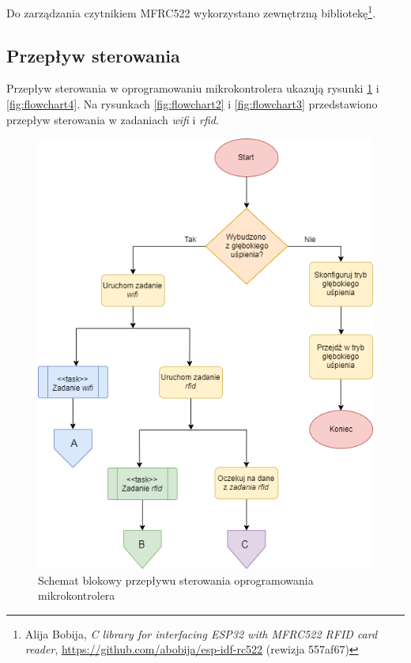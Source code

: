             Do zarządzania czytnikiem MFRC522 wykorzystano zewnętrzną bibliotekę\footnote{Alija Bobija, \textit{C library for interfacing ESP32 with MFRC522 RFID card reader}, \url{https://github.com/abobija/esp-idf-rc522} (rewizja 557af67)}.


        \subsection{Przepływ sterowania}

            Przepływ sterowania w oprogramowaniu mikrokontrolera ukazują rysunki \ref{fig:flowchart1} i \ref{fig:flowchart4}. Na rysunkach \ref{fig:flowchart2} i \ref{fig:flowchart3} przedstawiono przepływ sterowania w zadaniach \textit{wifi} i \textit{rfid}. 

            \begin{figure}[]
                \centering
                \includegraphics[width=\textwidth]{chapters/images/flowchart1.png}
                \caption{Schemat blokowy przepływu sterowania oprogramowania mikrokontrolera}
                \label{fig:flowchart1}
            \end{figure}


